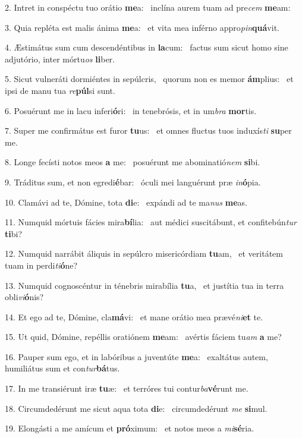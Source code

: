 2. Intret in conspéctu tuo orátio \textbf{me}a: \ast\  inclína aurem tuam ad pre\textit{cem} \textbf{me}am:\

3. Quia repléta est malis ánima \textbf{me}a: \ast\  et vita mea inférno appro\textit{pin}\textbf{quá}vit.\

4. Æstimátus sum cum descendéntibus in \textbf{la}cum: \ast\  factus sum sicut homo sine adjutório, inter mórtu\textit{os} \textbf{li}ber.\

5. Sicut vulneráti dormiéntes in sepúlcris, \dag\  quorum non es memor \textbf{ám}plius: \ast\  et ipsi de manu tua \textit{re}\textbf{púl}si sunt.\

6. Posuérunt me in lacu inferi\textbf{ó}ri: \ast\  in tenebrósis, et in um\textit{bra} \textbf{mor}tis.\

7. Super me confirmátus est furor \textbf{tu}us: \ast\  et omnes fluctus tuos induxís\textit{ti} \textbf{su}per me.\

8. Longe fecísti notos meos \textbf{a} me: \ast\  posuérunt me abominatió\textit{nem} \textbf{si}bi.\

9. Tráditus sum, et non egredi\textbf{é}bar: \ast\  óculi mei languérunt præ \textit{in}\textbf{ó}pia.\

10. Clamávi ad te, Dómine, tota \textbf{di}e: \ast\  expándi ad te ma\textit{nus} \textbf{me}as.\

11. Numquid mórtuis fácies mira\textbf{bí}lia: \ast\  aut médici suscitábunt, et confitebún\textit{tur} \textbf{ti}bi?\

12. Numquid narrábit áliquis in sepúlcro misericórdiam \textbf{tu}am, \ast\  et veritátem tuam in perdi\textit{ti}\textbf{ó}ne?\

13. Numquid cognoscéntur in ténebris mirabília \textbf{tu}a, \ast\  et justítia tua in terra obli\textit{vi}\textbf{ó}nis?\

14. Et ego ad te, Dómine, cla\textbf{má}vi: \ast\  et mane orátio mea prævé\textit{ni}\textbf{et} te.\

15. Ut quid, Dómine, repéllis oratiónem \textbf{me}am: \ast\  avértis fáciem tu\textit{am} \textbf{a} me?\

16. Pauper sum ego, et in labóribus a juventúte \textbf{me}a: \ast\  exaltátus autem, humiliátus sum et con\textit{tur}\textbf{bá}tus.\

17. In me transiérunt iræ \textbf{tu}æ: \ast\  et terróres tui contur\textit{ba}\textbf{vé}runt me.\

18. Circumdedérunt me sicut aqua tota \textbf{di}e: \ast\  circumdedérunt \textit{me} \textbf{si}mul.\

19. Elongásti a me amícum et \textbf{pró}ximum: \ast\  et notos meos a \textit{mi}\textbf{sé}ria.\

